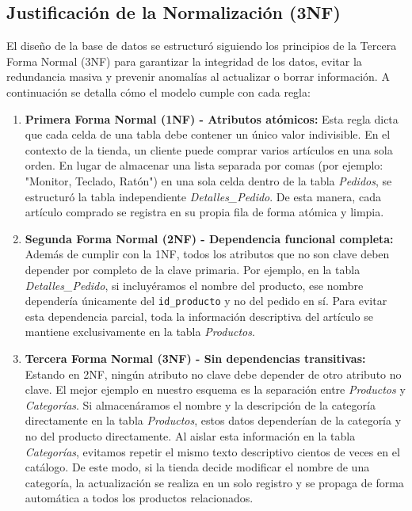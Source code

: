 \documentclass[11pt,a4paper]{article}
\begin{document}
\subsection{Justificación de la Normalización (3NF)}
El diseño de la base de datos se estructuró siguiendo los principios de la Tercera Forma Normal (3NF) para garantizar la integridad de los datos, evitar la redundancia masiva y prevenir anomalías al actualizar o borrar información. A continuación se detalla cómo el modelo cumple con cada regla:
\begin{enumerate}
    \item \textbf{Primera Forma Normal (1NF) - Atributos atómicos:} 
    Esta regla dicta que cada celda de una tabla debe contener un único valor indivisible. En el contexto de la tienda, un cliente puede comprar varios artículos en una sola orden. En lugar de almacenar una lista separada por comas (por ejemplo: "Monitor, Teclado, Ratón") en una sola celda dentro de la tabla \textit{Pedidos}, se estructuró la tabla independiente \textit{Detalles\_Pedido}. De esta manera, cada artículo comprado se registra en su propia fila de forma atómica y limpia.
    \item \textbf{Segunda Forma Normal (2NF) - Dependencia funcional completa:} 
    Además de cumplir con la 1NF, todos los atributos que no son clave deben depender por completo de la clave primaria. Por ejemplo, en la tabla \textit{Detalles\_Pedido}, si incluyéramos el nombre del producto, ese nombre dependería únicamente del \texttt{id\_producto} y no del pedido en sí. Para evitar esta dependencia parcial, toda la información descriptiva del artículo se mantiene exclusivamente en la tabla \textit{Productos}.
    \item \textbf{Tercera Forma Normal (3NF) - Sin dependencias transitivas:} 
    Estando en 2NF, ningún atributo no clave debe depender de otro atributo no clave. El mejor ejemplo en nuestro esquema es la separación entre \textit{Productos} y \textit{Categorías}. Si almacenáramos el nombre y la descripción de la categoría directamente en la tabla \textit{Productos}, estos datos dependerían de la categoría y no del producto directamente. Al aislar esta información en la tabla \textit{Categorías}, evitamos repetir el mismo texto descriptivo cientos de veces en el catálogo. De este modo, si la tienda decide modificar el nombre de una categoría, la actualización se realiza en un solo registro y se propaga de forma automática a todos los productos relacionados.
\end{enumerate}
\end{document}
